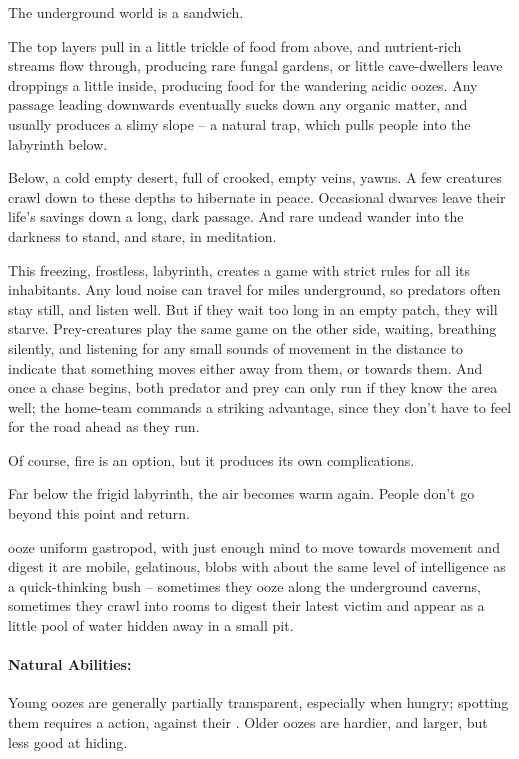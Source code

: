 \begin{multicols}{2}

\noindent
The underground world is a sandwich.

The top layers pull in a little trickle of food from above, and nutrient-rich streams flow through, producing rare fungal gardens, or little cave-dwellers leave droppings a little inside, producing food for the wandering acidic oozes.
Any passage leading downwards eventually sucks down any organic matter, and usually produces a slimy slope -- a natural trap, which pulls people into the labyrinth below.

Below, a cold empty desert, full of crooked, empty veins, yawns.
A few creatures crawl down to these depths to hibernate in peace.
Occasional dwarves leave their life's savings down a long, dark passage.
And rare undead wander into the darkness to stand, and stare, in meditation.

This freezing, frostless, labyrinth, creates a game with strict rules for all its inhabitants.
Any loud noise can travel for miles underground, so predators often stay still, and listen well.
But if they wait too long in an empty patch, they will starve.
Prey-creatures play the same game on the other side, waiting, breathing silently, and listening for any small sounds of movement in the distance to indicate that something moves either away from them, or towards them.
And once a chase begins, both predator and prey can only run if they know the area well; the home-team commands a striking advantage, since they don't have to feel for the road ahead as they run.

Of course, fire is an option, but it produces its own complications.

Far below the frigid labyrinth, the air becomes warm again.
People don't go beyond this point and return.

  {ooze}%
  {uniform gastropod, with just enough mind to move towards movement and digest it}%
are mobile, gelatinous, blobs with about the same level of intelligence as a quick-thinking bush -- sometimes they ooze along the underground caverns, sometimes they crawl into rooms to digest their latest victim and appear as a little pool of water hidden away in a small pit.

\paragraph{Natural Abilities:} Young oozes are generally partially transparent, especially when hungry; spotting them requires a  action, against their .
Older oozes are hardier, and larger, but less good at hiding.


\end{multicols}
